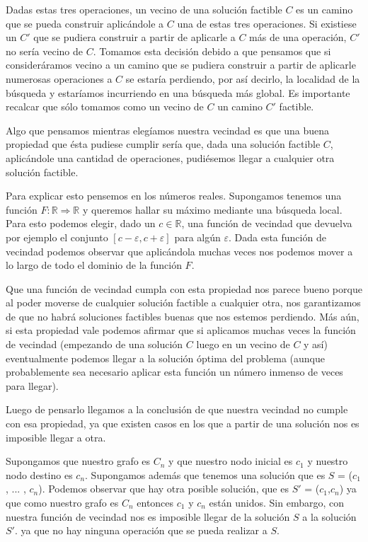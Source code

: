 Dadas estas tres operaciones, un vecino de una solución factible $C$ es un camino que se pueda construir aplicándole a $C$ una de estas tres operaciones. Si existiese un $C'$ que se pudiera construir a partir de aplicarle a $C$ más de una operación, $C'$ no sería vecino de $C$. Tomamos esta decisión debido a que pensamos que si consideráramos vecino a un camino que se pudiera construir a partir de aplicarle numerosas operaciones a $C$ se estaría perdiendo, por así decirlo, la localidad de la búsqueda y estaríamos incurriendo en una búsqueda más global. Es importante recalcar que sólo tomamos como un vecino de $C$ un camino $C'$ factible.

Algo que pensamos mientras elegíamos nuestra vecindad es que una buena propiedad que ésta pudiese cumplir sería que, dada una solución factible $C$, aplicándole una cantidad de operaciones, pudiésemos llegar a cualquier otra solución factible.

Para explicar esto pensemos en los números reales. Supongamos tenemos una función $F: \mathbb{R} \Rightarrow \mathbb{R}$ y queremos hallar su máximo mediante una búsqueda local. Para esto podemos elegir, dado un $c \in \mathbb{R}$, una función de vecindad que devuelva por ejemplo el conjunto $[c-\varepsilon, c+\varepsilon]$  para algún $\varepsilon$. Dada esta función de vecindad podemos observar que aplicándola muchas veces nos podemos mover a lo largo de todo el dominio de la función $F$.

Que una función de vecindad cumpla con esta propiedad nos parece bueno porque al poder moverse de cualquier solución factible a cualquier otra, nos garantizamos de que no habrá soluciones factibles buenas que nos estemos perdiendo. Más aún, si esta propiedad vale podemos afirmar que si aplicamos muchas veces la función de vecindad (empezando de una solución $C$ luego en un vecino de $C$ y así) eventualmente podemos llegar a la solución óptima del problema (aunque probablemente sea necesario aplicar esta función un número inmenso de veces para llegar).

Luego de pensarlo llegamos a la conclusión de que nuestra vecindad no cumple con esa propiedad, ya que existen casos en los que a partir de una solución nos es imposible llegar a otra.

Supongamos que nuestro grafo es $C_n$ y que nuestro nodo inicial es $c_1$ y nuestro nodo destino es $c_n$. Supongamos además que tenemos una solución que es $S$ = ($c_1$, ... , $c_n$). Podemos observar que hay otra posible solución, que es $S'$ = ($c_1$,$c_n$) ya que como nuestro grafo es $C_n$ entonces $c_1$ y $c_n$ están unidos. Sin embargo, con nuestra función de vecindad nos es imposible llegar de la solución $S$ a la solución $S'$. ya que no hay ninguna operación que se pueda realizar a $S$. 


